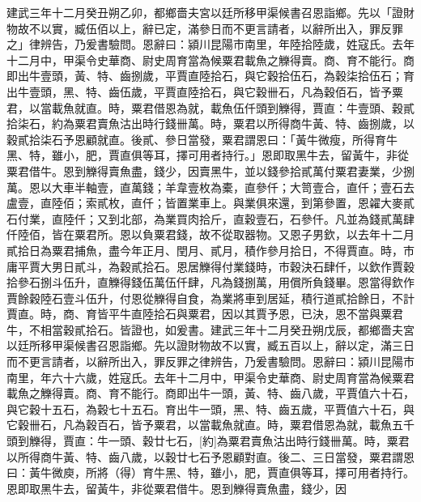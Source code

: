 \documentclass[12pt,a4paper]{article}
\begin{document}
建武三年十二月癸丑朔乙卯，都鄉嗇夫宮以廷所移甲渠候書召恩詣鄉。先以「證財物故不以實，臧伍佰以上，辭已定，滿參日而不更言請者，以辭所出入，罪反罪之」律辨告，乃爰書驗問。恩辭曰：潁川昆陽市南里，年陸拾陸歲，姓寇氏。去年十二月中，甲渠令史華商、尉史周育當為候粟君載魚之觻得賣。商、育不能行。商即出牛壹頭，黃、特、齒捌歲，平賈直陸拾石，與它穀拾伍石，為穀柒拾伍石；育出牛壹頭，黑、特、齒伍歲，平賈直陸拾石，與它穀卌石，凡為穀佰石，皆予粟君，以當載魚就直。時，粟君借恩為就，載魚伍仟頭到觻得，賈直：牛壹頭、穀貳拾柒石，約為粟君賣魚沽出時行錢卌萬。時，粟君以所得商牛黃、特、齒捌歲，以穀貳拾柒石予恩顧就直。後貳、參日當發，粟君謂恩曰：「黃牛微瘦，所得育牛黑、特，雖小，肥，賈直俱等耳，擇可用者持行。」恩即取黑牛去，留黃牛，非從粟君借牛。恩到觻得賣魚盡，錢少，因賣黑牛，並以錢參拾貳萬付粟君妻業，少捌萬。恩以大車半軸壹，直萬錢；羊韋壹枚為橐，直參仟；大笥壹合，直仟；壹石去盧壹，直陸佰；索貳枚，直仟；皆置業車上。與業俱來還，到第參置，恩糴大麥貳石付業，直陸仟；又到北部，為業買肉拾斤，直穀壹石，石參仟。凡並為錢貳萬肆仟陸佰，皆在粟君所。恩以負粟君錢，故不從取器物。又恩子男欽，以去年十二月貳拾日為粟君捕魚，盡今年正月、閏月、貳月，積作參月拾日，不得賈直。時，市庸平賈大男日貳斗，為穀貳拾石。恩居觻得付業錢時，市穀決石肆仟，以欽作賈穀拾參石捌斗伍升，直觻得錢伍萬伍仟肆，凡為錢捌萬，用償所負錢畢。恩當得欽作賈餘穀陸石壹斗伍升，付恩從觻得自食，為業將車到居延，積行道貳拾餘日，不計賈直。時，商、育皆平牛直陸拾石與粟君，因以其賈予恩，已決，恩不當與粟君牛，不相當穀貳拾石。皆證也，如爰書。建武三年十二月癸丑朔戊辰，都鄉嗇夫宮以廷所移甲渠候書召恩詣鄉。先以證財物故不以實，臧五百以上，辭以定，滿三日而不更言請者，以辭所出入，罪反罪之律辨告，乃爰書驗問。恩辭曰：潁川昆陽市南里，年六十六歲，姓寇氏。去年十二月中，甲渠令史華商、尉史周育當為候粟君載魚之觻得賣。商、育不能行。商即出牛一頭，黃、特、齒八歲，平賈值六十石，與它穀十五石，為穀七十五石。育出牛一頭，黑、特、齒五歲，平賈值六十石，與它穀卌石，凡為穀百石，皆予粟君，以當載魚就直。時，粟君借恩為就，載魚五千頭到觻得，賈直：牛一頭、穀廿七石，[約]為粟君賣魚沽出時行錢卌萬。時，粟君以所得商牛黃、特、齒八歲，以穀廿七石予恩顧對直。後二、三日當發，粟君謂恩曰：黃牛微庾，所將（得）育牛黑、特，雖小，肥，賈直俱等耳，擇可用者持行。恩即取黑牛去，留黃牛，非從粟君借牛。恩到觻得賣魚盡，錢少，因
\end{document}
